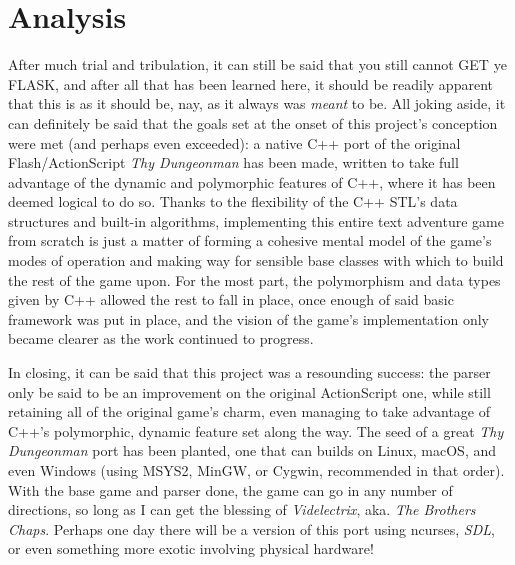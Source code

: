 \documentclass[man,12pt]{apa6}
\begin{document}
\section{Analysis}
After much trial and tribulation, it can still be said that you still cannot
\textsf{GET ye FLASK}, and after all that has been learned here, it should be
readily apparent that this is as it should be, nay, as it always was
\emph{meant} to be.  All joking aside, it can definitely be said that the
goals set at the onset of this project's conception were met (and perhaps even
exceeded): a native C++ port of the original Flash/ActionScript \emph{Thy
Dungeonman} has been made, written to take full advantage of the dynamic and
polymorphic features of C++, where it has been deemed logical to do so.
Thanks to the flexibility of the C++ STL's data structures and
built-in algorithms, implementing this entire text adventure game from scratch
is just a matter of forming a cohesive mental model of the game's modes of
operation and making way for sensible base classes with which to
build the rest of the game upon.  For the most part, the polymorphism and data
types given by C++ allowed the rest to fall in place, once enough of
said basic framework was put in place, and the vision of the game's
implementation only became clearer as the work continued to progress.

In closing, it can be said that this project was a resounding success: the
parser only be said to be an improvement on the original ActionScript one,
while still retaining all of the original game's charm, even managing to take
advantage of C++'s polymorphic, dynamic feature set along the way.  The seed of
a great \emph{Thy Dungeonman} port has been planted, one that can builds on
Linux, macOS, and even Windows (using MSYS2, MinGW, or Cygwin, recommended in
that order).  With the base game and parser done, the game
can go in any number of directions, so long as I can get the blessing of
\emph{Videlectrix}, aka. \emph{The Brothers Chaps}.  Perhaps one day there will
be a version of this port using \textsf{ncurses}, \emph{SDL}, or even something
more exotic involving physical hardware!

\printbibliography
\end{document}
